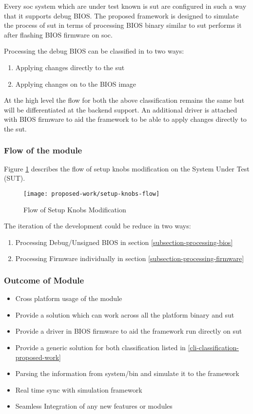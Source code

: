 Every \gls{soc} system which are under test known is \gls{sut} are configured in such a way that it supports debug BIOS. The proposed framework is designed to simulate the process of \gls{sut} in terms of processing BIOS binary similar to \gls{sut} performs it after flashing BIOS firmware on \gls{soc}. 

Processing the debug BIOS can be classified in to two ways:
\begin{enumerate}\label{cli-classification-proposed-work}
	\item Applying changes directly to the \gls{sut}
	\item Applying changes on to the BIOS image
\end{enumerate}

At the high level the flow for both the above classification remains the same but will be differentiated at the backend support. An additional driver is attached with BIOS firmware to aid the framework to be able to apply changes directly to the \gls{sut}.

\subsubsection{Flow of the module}
Figure \ref{fig:setup-knobs-flow} describes the flow of setup knobs modification on the System Under Test (SUT).

\begin{figure}[!htbp]
	\centering
	\texttt{[image: proposed-work/setup-knobs-flow]}
	\caption{Flow of Setup Knobs Modification}\label{fig:setup-knobs-flow}
\end{figure}

The iteration of the development could be reduce in two ways:
\begin{enumerate}
	\item Processing Debug/Unsigned BIOS in section \ref{subsection-processing-bios}
	\item Processing Firmware individually in section \ref{subsection-processing-firmware}
\end{enumerate}


\subsubsection{Outcome of Module}
\begin{itemize}
	\item Cross platform usage of the module
	\item Provide a solution which can work across all the platform binary and \gls{sut}
	\item Provide a driver in BIOS firmware to aid the framework run directly on \gls{sut}
	\item Provide a generic solution for both classification listed in \ref{cli-classification-proposed-work}
	\item Parsing the information from system/bin and simulate it to the framework
	\item Real time sync with simulation framework
	\item Seamless Integration of any new features or modules
\end{itemize}

